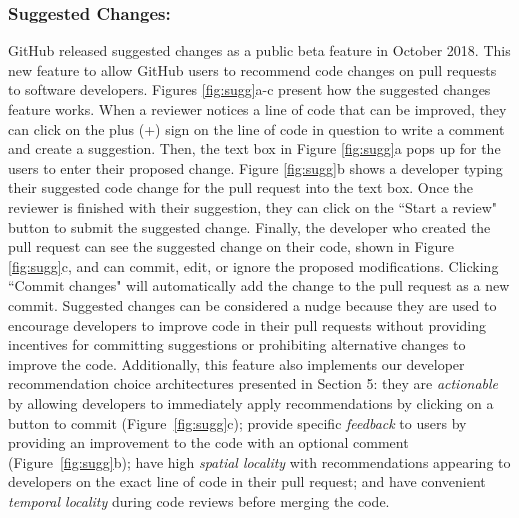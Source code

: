 \subsubsection{Suggested Changes:} GitHub released suggested changes as a public beta feature in October 2018. This new feature to allow GitHub users to recommend code changes on pull requests to software developers. Figures \ref{fig:sugg}a-c present how the suggested changes feature works. When a reviewer notices a line of code that can be improved, they can click on the plus (+) sign on the line of code in question to write a comment and create a suggestion. Then, the text box in Figure \ref{fig:sugg}a pops up for the users to enter their proposed change. Figure \ref{fig:sugg}b shows a developer typing their suggested code change for the pull request into the text box. Once the reviewer is finished with their suggestion, they can click on the ``Start a review" button to submit the suggested change. Finally, the developer who created the pull request can see the suggested change on their code, shown in Figure \ref{fig:sugg}c, and can commit, edit, or ignore the proposed modifications. Clicking ``Commit changes" will automatically add the change to the pull request as a new commit. Suggested changes can be considered a nudge because they are used to encourage developers to improve code in their pull requests without providing incentives for committing suggestions or prohibiting alternative changes to improve the code. Additionally, this feature also implements our developer recommendation choice architectures presented in Section 5: they are \textit{actionable} by allowing developers to immediately apply recommendations by clicking on a button to commit (Figure~\ref{fig:sugg}c); provide specific \textit{feedback} to users by providing an improvement to the code with an optional comment (Figure~\ref{fig:sugg}b); have high \textit{spatial locality} with recommendations appearing to developers on the exact line of code in their pull request; and have convenient \textit{temporal locality} during code reviews before merging the code.


